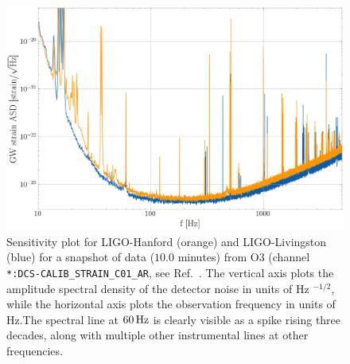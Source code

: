 \documentclass[pra,superscriptaddress,reprint,amsmath,amssymb,nofootinbib]{revtex4-2}
\begin{document}
\begin{figure}
	\begin{center}
		\includegraphics[width=\columnwidth]{images/sensitivity}
	\end{center}
	\caption{Sensitivity plot for LIGO-Hanford (orange) and LIGO-Livingston (blue) for a snapshot of data ($10.0$ minutes) from O3 (channel \texttt{*:DCS-CALIB\_STRAIN\_C01\_AR}, see Ref.~\cite{LIGO_O3, GWOSC:online}. The vertical axis plots the amplitude spectral density of the detector noise in units of Hz $^{-1/2}$, while the horizontal axis plots the observation frequency in units of Hz.The spectral line at $60\,{\rm Hz}$ is clearly visible as a spike rising three decades, along with multiple other instrumental lines at other frequencies.}\label{fig:strainSensitivity}
\end{figure}
\end{document}
